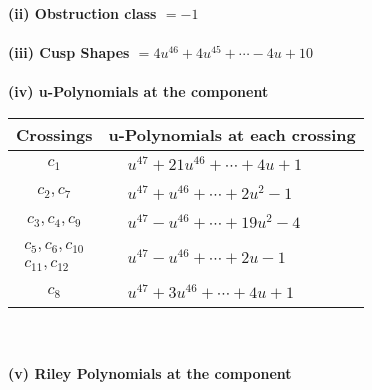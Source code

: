\documentclass[1p]{elsarticle_modified}
\theoremstyle{definition}
\begin{document}
\flushleft \textbf{(ii) Obstruction class $= -1$}\\~\\
\flushleft \textbf{(iii) Cusp Shapes $= 4 u^{46}+4 u^{45}+\cdots-4 u+10$}\\~\\
\newpage\renewcommand{\arraystretch}{1}
\flushleft \textbf{(iv) u-Polynomials at the component}\newline \\
\begin{tabular}{m{50pt}|m{274pt}}
Crossings & \hspace{64pt}u-Polynomials at each crossing \\
\hline $$\begin{aligned}c_{1}\end{aligned}$$&$\begin{aligned}
&u^{47}+21 u^{46}+\cdots+4 u+1
\end{aligned}$\\
\hline $$\begin{aligned}c_{2},c_{7}\end{aligned}$$&$\begin{aligned}
&u^{47}+u^{46}+\cdots+2 u^2-1
\end{aligned}$\\
\hline $$\begin{aligned}c_{3},c_{4},c_{9}\end{aligned}$$&$\begin{aligned}
&u^{47}- u^{46}+\cdots+19 u^2-4
\end{aligned}$\\
\hline $$\begin{aligned}c_{5},c_{6},c_{10}\\c_{11},c_{12}\end{aligned}$$&$\begin{aligned}
&u^{47}- u^{46}+\cdots+2 u-1
\end{aligned}$\\
\hline $$\begin{aligned}c_{8}\end{aligned}$$&$\begin{aligned}
&u^{47}+3 u^{46}+\cdots+4 u+1
\end{aligned}$\\
\hline
\end{tabular}\\~\\
\newpage\renewcommand{\arraystretch}{1}
\flushleft \textbf{(v) Riley Polynomials at the component}\newline \\
\end{document}
